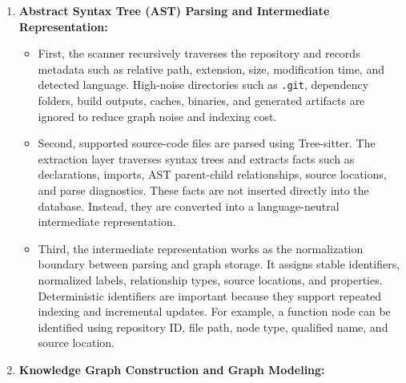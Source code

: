 \documentclass[conference]{IEEEtran}
\begin{document}
\begin{enumerate}
    \item \textbf{Abstract Syntax Tree (AST) Parsing and Intermediate Representation:}\\

    \begin{itemize}
        \item [-] First, the scanner recursively traverses the repository and records metadata such as relative path, extension, size, modification time, and detected language. High-noise directories such as \texttt{.git}, dependency folders, build outputs, caches, binaries, and generated artifacts are ignored to reduce graph noise and indexing cost.\\

         \item [-] Second, supported source-code files are parsed using Tree-sitter. The extraction layer traverses syntax trees and extracts facts such as declarations, imports, AST parent-child relationships, source locations, and parse diagnostics. These facts are not inserted directly into the database. Instead, they are converted into a language-neutral intermediate representation.\\
         
         \item [-] Third, the intermediate representation works as the normalization boundary between parsing and graph storage. It assigns stable identifiers, normalized labels, relationship types, source locations, and properties. Deterministic identifiers are important because they support repeated indexing and incremental updates. For example, a function node can be identified using repository ID, file path, node type, qualified name, and source location.\\
         
    \end{itemize}

    \item \textbf{Knowledge Graph Construction and Graph Modeling:}\\


\end{enumerate}
\end{document}
